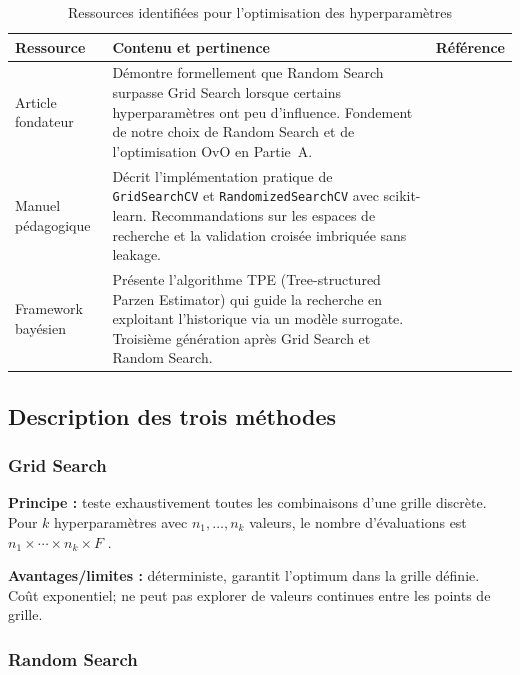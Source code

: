 \documentclass[11pt,a4paper]{article}
\newcommand{\code}[1]{\texttt{\small #1}}
\begin{document}
\begin{table}[H]
\caption{Ressources identifiées pour l'optimisation des hyperparamètres}
\label{tab:ressources}
\centering\small
\begin{tabularx}{\linewidth}{L{3.2cm} X L{4.5cm}}
\toprule
{}
\textbf{Ressource} & \textbf{Contenu et pertinence} & \textbf{Référence} \\
\midrule
Article fondateur &
  Démontre formellement que Random Search surpasse Grid Search lorsque
  certains hyperparamètres ont peu d'influence. Fondement de notre
  choix de Random Search et de l'optimisation OvO en Partie~A. &
  \textcite{bergstra2012} \\
Manuel pédagogique &
  Décrit l'implémentation pratique de \code{GridSearchCV} et
  \code{RandomizedSearchCV} avec scikit-learn. Recommandations sur les
  espaces de recherche et la validation croisée imbriquée sans leakage. &
  \textcite{geron2019} \\
Framework bayésien &
  Présente l'algorithme TPE (Tree-structured Parzen Estimator) qui
  guide la recherche en exploitant l'historique via un modèle surrogate.
  Troisième génération après Grid Search et Random Search. &
  \textcite{akiba2019} \\
\bottomrule
\end{tabularx}
\end{table}

\subsection{Description des trois méthodes}

\subsubsection{Grid Search}

\textbf{Principe :} teste exhaustivement toutes les combinaisons d'une
grille discrète. Pour $k$ hyperparamètres avec $n_1, \ldots, n_k$ valeurs,
le nombre d'évaluations est $n_1 \times \cdots \times n_k \times F$
\parencite{geron2019}.

\textbf{Avantages/limites :} déterministe, garantit l'optimum dans la
grille définie. Coût exponentiel; ne peut pas explorer de valeurs continues
entre les points de grille.

\subsubsection{Random Search}
\end{document}
